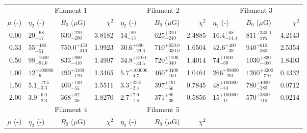 \begin{tabular}{@{}rllr llr llr@{}}

\toprule
{} & \multicolumn{3}{c}{Filament 1}
   & \multicolumn{3}{c}{Filament 2}
   & \multicolumn{3}{c}{Filament 3} \\
\cmidrule(lr){2-4} \cmidrule(lr){5-7} \cmidrule(lr){8-10}
$\mu$ (-) & $\eta_2$ (-) & $B_0$ ($\mu$G) & $\chi^2$
          & $\eta_2$ (-) & $B_0$ ($\mu$G) & $\chi^2$
          & $\eta_2$ (-) & $B_0$ ($\mu$G) & $\chi^2$ \\

\midrule
0.00 & ${20}^{+68}_{-17}$ & ${630}^{+220}_{-200}$ & 3.8182
     & ${14}^{+89}_{-13}$ & ${625}^{+310}_{-240}$ & 2.4885
     & ${16.4}^{+68}_{-14.4}$ & ${811}^{+330.0}_{-275}$ & 4.2143\\
0.33 & ${55}^{+480}_{-51}$ & ${750.0}^{+450}_{-310}$ & 1.9923
     & ${30.6}^{+680}_{-29.3}$ & ${710}^{+650.0}_{-330.0}$ & 1.6504
     & ${42.6}^{+400}_{-39}$ & ${940}^{+610}_{-380}$ & 2.5354\\
0.50 & ${98}^{+1600}_{-94.0}$ & ${833}^{+690}_{-410}$ & 1.4907
     & ${34.8}^{+3100}_{-33.5}$ & ${720}^{+1100}_{-340}$ & 1.4014
     & ${74}^{+1000}_{-69}$ & ${1030}^{+830}_{-460}$ & 1.8403\\
1.00 & ${12}^{+100000}_{-9}$ & ${490}^{+3100}_{-120}$ & 1.3465
     & ${5.7}^{+100000}_{-4.7}$ & ${460}^{+3400}_{-100}$ & 1.0464
     & ${266}^{+98000}_{-261}$ & ${1260}^{+3200}_{-710}$ & 0.4332\\
1.50 & ${5.1}^{+17.5}_{-3.3}$ & ${400}^{+130}_{-55}$ & 1.5511
     & ${3.3}^{+23.5}_{-2.4}$ & ${397}^{+191}_{-56}$ & 0.7845
     & ${48}^{+100000}_{-44}$ & ${780}^{+4000}_{-280}$ & 0.0712\\
2.00 & ${3.9}^{+6.0}_{-2.3}$ & ${368}^{+62}_{-38}$ & 1.8270
     & ${2.7}^{+7.0}_{-1.8}$ & ${371}^{+80}_{-39}$ & 0.5856
     & ${15}^{+100000}_{-11}$ & ${570}^{+3800}_{-110}$ & 0.0214\\

\midrule
{} & \multicolumn{3}{c}{Filament 4}
   & \multicolumn{3}{c}{Filament 5} \\
\cmidrule(lr){2-4} \cmidrule(lr){5-7}
$\mu$ (-) & $\eta_2$ (-) & $B_0$ ($\mu$G) & $\chi^2$
          & $\eta_2$ (-) & $B_0$ ($\mu$G) & $\chi^2$ \\


\end{tabular}
